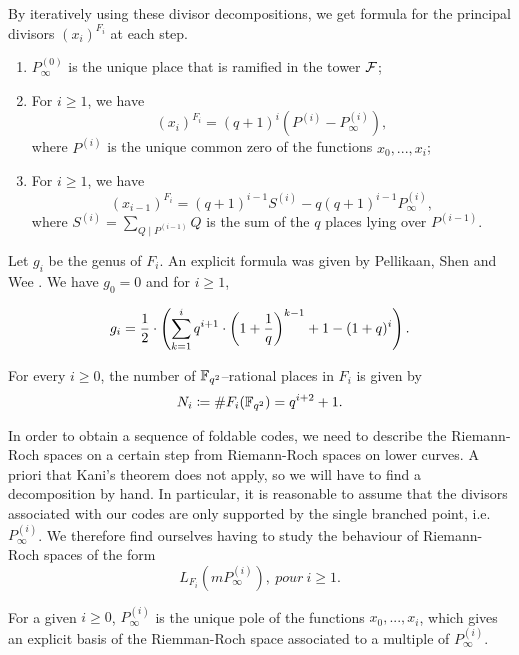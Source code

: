 \documentclass[10pt]{article}
\begin{document}
By iteratively using these divisor decompositions, we get formula for the principal divisors $(x_i)^{F_i}$ at each step.
\begin{lemma}
\begin{enumerate}
\item $P_{\infty}^{(0)}$ is the unique place that is ramified in the tower $\mathcal{F}$;
\item For $i \geq 1$, we have 
\[(x_i)^{F_i} = (q+1)^i \left(P^{(i)} - P_{\infty}^{(i)}\right),\]
where $P^{(i)}$ is the unique common zero of the functions $x_0,...,x_i$;
\item For $i \geq 1$, we have 
\[(x_{i-1})^{F_i} = (q+1)^{i-1}S^{(i)} - q(q+1)^{i-1}P_{\infty}^{(i)},\]
where $ S^{(i)} = \sum_{Q\mid P^{(i-1)}} Q$ is the sum of the $q$ places lying over $P^{(i-1)}$.
\end{enumerate}
\end{lemma}

Let $g_i$ be the genus of $F_i$.  An explicit formula was given by Pellikaan, Shen and Wee \cite[Proposition 4]{PSW91}. We have $g_0=0$ and for $i\geq 1$, 

\begin{equation}\label{eq:genus_herm}
	g_i =\dfrac{1}{2} \cdot \left(\sum\limits_{k=1}^i q^{i+1} \cdot \left(1+\frac{1}{q}\right)^{k-1} +1 -(1+q)^i\right).
\end{equation}

For every $i \geq 0$, the number of $\mathbb{F}_{q^2}$--rational places in $F_i$ is given by
\[N_i \coloneqq \#F_i(\mathbb{F}_{q^2}) = q^{i+2}+1.\]

In order to obtain a sequence of foldable codes, we need to describe the Riemann-Roch spaces on a certain step from Riemann-Roch spaces on lower curves. A priori that Kani's theorem does not apply, so we will have to find a decomposition by hand. In particular, it is reasonable to assume that the divisors associated with our codes are only supported by the single branched point, i.e. $P^{(i)}_{\infty}$. We therefore find ourselves having to study the behaviour of Riemann-Roch spaces of the form 
\[L_{F_i}\left(mP^{(i)}_{\infty}\right), \ pour \ i \geq 1.\] 

For a given $i \geq 0$, $P^{(i)}_{\infty}$ is the unique pole of the functions $x_0,...,x_i$, which gives an explicit basis of the Riemman-Roch space associated to a multiple of $P^{(i)}_{\infty}$.
\end{document}
